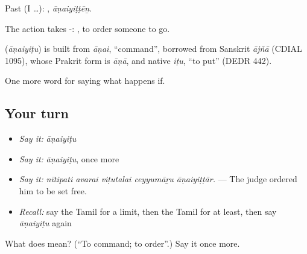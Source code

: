 Past (I …): , \emph{āṇaiyiṭṭēṉ}.

The action takes -:  , to order someone to go.

\begin{cousinweb}
\textbf{} (\emph{āṇaiyiṭu}) is built from \emph{āṇai}, \textquotedblleft{}command\textquotedblright{}, borrowed from Sanskrit \emph{ājñā} (CDIAL 1095), whose Prakrit form is \emph{āṇā}, and native \emph{iṭu}, \textquotedblleft{}to put\textquotedblright{} (DEDR 442).
\end{cousinweb}

\begin{grammarlens}[title={What you've built}]
One more word for saying what happens if.
\end{grammarlens}

\subsection*{Your turn}
\begin{itemize}
\raggedright
  \item \emph{Say it:} \emph{āṇaiyiṭu}
  \item \emph{Say it:} \emph{āṇaiyiṭu}, once more
  \item \emph{Say it:} \emph{nītipati avarai viṭutalai ceyyumāṟu āṇaiyiṭṭār.} — The judge ordered him to be set free.
  \item \emph{Recall:} say the Tamil for a limit, then the Tamil for at least, then say \emph{āṇaiyiṭu} again
\end{itemize}

\begin{tcolorbox}[breakable,colback=teal!4,colframe=teal!35!black,title={Before you move on}]
What does  mean? (\textquotedblleft{}To command; to order\textquotedblright{}.) Say it once more.
\end{tcolorbox}
